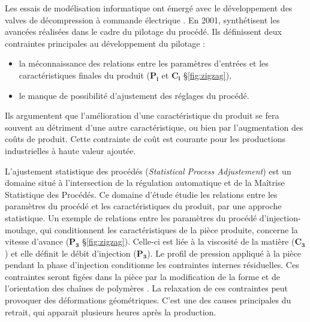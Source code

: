 Les essais de modélisation informatique ont émergé avec le développement des valves de décompression à commande électrique \cite{ma_design_1974}.
En 2001, \cite{nwokah_control_2001} synthétisent les avancées réalisées dans le cadre du pilotage du procédé.
Ils définissent deux contraintes principales au développement du pilotage :
\begin{itemize}
\item la méconnaissance des relations entre les paramètres d’entrées et les caractéristiques finales du produit ($\boldsymbol{P_i}$ et $\boldsymbol{C_i}$ §\ref{fig:zigzag}),
\item le manque de possibilité d’ajustement des réglages du procédé.
\end{itemize}
Ils argumentent que l’amélioration d’une caractéristique du produit se fera souvent au détriment d’une autre caractéristique, ou bien par l'augmentation des coûts de produit.
Cette contrainte de coût est courante pour les productions industrielles à haute valeur ajoutée.

L’ajustement statistique des procédés (\textit{Statistical Process Adjustement}) est un domaine situé à l’intersection de la régulation automatique et de la Maîtrise Statistique des Procédés.
Ce domaine d'étude étudie les relations entre les paramètres du procédé et les caractéristiques du produit, par une approche statistique.
Un exemple de relations entre les paramètres du procédé d’injection-moulage, qui conditionnent les caractéristiques de la pièce produite, concerne la vitesse d'avance ($\boldsymbol{P_3}$ §\ref{fig:zigzag}).
Celle-ci est liée à la viscosité de la matière ($\boldsymbol{C_3}$) et elle définit le débit d’injection ($\boldsymbol{P_3}$).
Le profil de pression appliqué à la pièce pendant la phase d'injection conditionne les contraintes internes résiduelles.
Ces contraintes seront figées dans la pièce par la modification de la forme et de l'orientation des chaînes de polymères \cite{giroud_mesure_2001}.
La relaxation de ces contraintes peut provoquer des déformations géométriques.
C'est une des causes principales du retrait, qui apparait plusieurs heures après la production.

